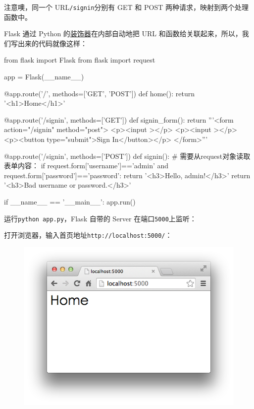 注意噢，同一个 URL\texttt{/signin}分别有 GET 和 POST
两种请求，映射到两个处理函数中。

Flask 通过 Python
的\href{https://www.liaoxuefeng.com/wiki/1016959663602400/1017451662295584}{装饰器}在内部自动地把
URL 和函数给关联起来，所以，我们写出来的代码就像这样：

\begin{pythoncode}
from flask import Flask
from flask import request

app = Flask(__name__)

@app.route('/', methods=['GET', 'POST'])
def home():
    return '<h1>Home</h1>'

@app.route('/signin', methods=['GET'])
def signin_form():
    return '''<form action="/signin" method="post">
              <p><input ></p>
              <p><input ></p>
              <p><button type="submit">Sign In</button></p>
              </form>'''

@app.route('/signin', methods=['POST'])
def signin():
    # 需要从request对象读取表单内容：
    if request.form['username']=='admin' and request.form['password']=='password':
        return '<h3>Hello, admin!</h3>'
    return '<h3>Bad username or password.</h3>'

if __name__ == '__main__':
    app.run()
\end{pythoncode}

运行\texttt{python\ app.py}，Flask 自带的 Server
在端口\texttt{5000}上监听：


打开浏览器，输入首页地址\texttt{http://localhost:5000/}：

 
 \begin{figure}[htp]
	\centering
	\includegraphics[width=0.6\linewidth]{fig/951373547960800.png}
\end{figure}


